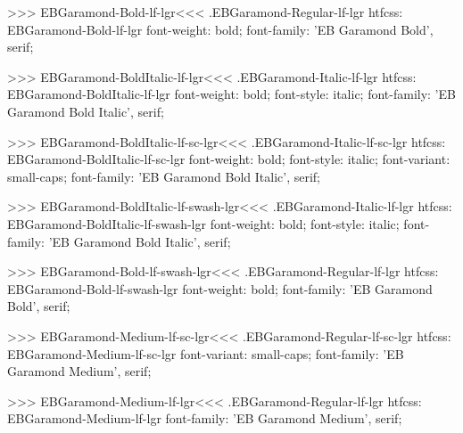 >>>
\<EBGaramond-Bold-lf-lgr\><<<
.EBGaramond-Regular-lf-lgr
htfcss:  EBGaramond-Bold-lf-lgr  font-weight: bold; font-family: 'EB Garamond Bold', serif;

>>>
\<EBGaramond-BoldItalic-lf-lgr\><<<
.EBGaramond-Italic-lf-lgr
htfcss:  EBGaramond-BoldItalic-lf-lgr  font-weight: bold; font-style: italic; font-family: 'EB Garamond Bold Italic', serif;

>>>
\<EBGaramond-BoldItalic-lf-sc-lgr\><<<
.EBGaramond-Italic-lf-sc-lgr
htfcss:  EBGaramond-BoldItalic-lf-sc-lgr  font-weight: bold; font-style: italic; font-variant: small-caps; font-family: 'EB Garamond Bold Italic', serif;

>>>
\<EBGaramond-BoldItalic-lf-swash-lgr\><<<
.EBGaramond-Italic-lf-lgr
htfcss:  EBGaramond-BoldItalic-lf-swash-lgr  font-weight: bold; font-style: italic; font-family: 'EB Garamond Bold Italic', serif;

>>>
\<EBGaramond-Bold-lf-swash-lgr\><<<
.EBGaramond-Regular-lf-lgr
htfcss:  EBGaramond-Bold-lf-swash-lgr  font-weight: bold; font-family: 'EB Garamond Bold', serif;

>>>
\<EBGaramond-Medium-lf-sc-lgr\><<<
.EBGaramond-Regular-lf-sc-lgr
htfcss:  EBGaramond-Medium-lf-sc-lgr  font-variant: small-caps; font-family: 'EB Garamond Medium', serif;

>>>
\<EBGaramond-Medium-lf-lgr\><<<
.EBGaramond-Regular-lf-lgr
htfcss:  EBGaramond-Medium-lf-lgr  font-family: 'EB Garamond Medium', serif;

